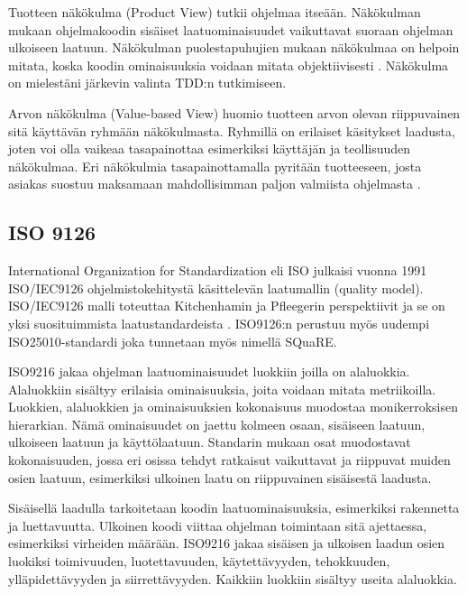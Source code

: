 \documentclass[finnish]{tktltiki2}
\theoremstyle{definition}
\theoremstyle{remark}
\begin{document}
Tuotteen näkökulma (Product View) tutkii ohjelmaa itseään. Näkökulman mukaan ohjelmakoodin sisäiset laatuominaisuudet vaikuttavat suoraan ohjelman ulkoiseen laatuun. Näkökulman puolestapuhujien mukaan näkökulmaa on helpoin mitata, koska koodin ominaisuuksia voidaan mitata objektiivisesti \cite{Kitchenham96}. Näkökulma on mielestäni järkevin valinta TDD:n tutkimiseen.

Arvon näkökulma (Value-based View) huomio tuotteen arvon olevan riippuvainen sitä käyttävän ryhmään näkökulmasta. Ryhmillä on erilaiset käsitykset laadusta, joten voi olla vaikeaa tasapainottaa esimerkiksi käyttäjän ja teollisuuden näkökulmaa. Eri näkökulmia tasapainottamalla pyritään tuotteeseen, josta asiakas suostuu maksamaan mahdollisimman paljon valmiista ohjelmasta \cite{Kitchenham96}.  

\subsection{ISO 9126}

International Organization for Standardization eli ISO julkaisi vuonna 1991 ISO/IEC9126 ohjelmistokehitystä käsittelevän laatumallin (quality model). \cite{ISO9126}  ISO/IEC9126 malli toteuttaa Kitchenhamin ja Pfleegerin perspektiivit \cite{Cote07}  ja se on yksi suosituimmista laatustandardeista \cite{Botella04}. ISO9126:n perustuu myös uudempi ISO25010-standardi joka tunnetaan myös nimellä SQuaRE. \cite{ISO2011}

 ISO9216 jakaa ohjelman laatuominaisuudet luokkiin joilla on alaluokkia. Alaluokkiin sisältyy erilaisia ominaisuuksia, joita voidaan mitata metriikoilla. Luokkien, alaluokkien ja ominaisuuksien kokonaisuus muodostaa monikerroksisen hierarkian.\cite{Miguel14} Nämä ominaisuudet on jaettu kolmeen osaan, sisäiseen laatuun, ulkoiseen laatuun ja käyttölaatuun. Standarin mukaan osat muodostavat kokonaisuuden, jossa eri osissa tehdyt ratkaisut vaikuttavat ja riippuvat muiden osien laatuun, esimerkiksi ulkoinen laatu on riippuvainen sisäisestä laadusta.



Sisäisellä laadulla tarkoitetaan koodin laatuominaisuuksia, esimerkiksi rakennetta ja luettavuutta. Ulkoinen koodi viittaa ohjelman toimintaan sitä ajettaessa, esimerkiksi virheiden määrään. ISO9216 jakaa sisäisen ja ulkoisen laadun osien luokiksi toimivuuden, luotettavuuden, käytettävyyden, tehokkuuden, ylläpidettävyyden ja siirrettävyyden. Kaikkiin luokkiin sisältyy useita alaluokkia.
\end{document}
